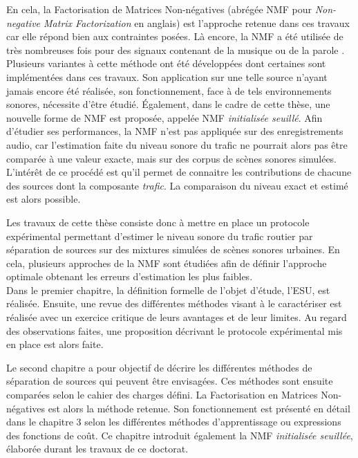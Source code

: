 En cela, la Factorisation de Matrices Non-négatives (abrégée NMF pour \textit{Non-negative Matrix Factorization} en anglais) \cite{lee_learning_1999} est l'approche retenue dans ces travaux car elle répond bien aux contraintes posées. Là encore, la NMF a été utilisée de très nombreuses fois pour des signaux contenant de la musique \cite{helen2005separation,fevotte_nonnegative_2009} ou de la parole \cite{wilson2008speech,schmidt2006single}. Plusieurs variantes à cette méthode ont été développées dont certaines sont implémentées dans ces travaux. Son application sur une telle source n'ayant jamais encore été réalisée, son fonctionnement, face à de tels environnements sonores,  nécessite d'être étudié. Également, dans le cadre de cette thèse, une nouvelle forme de NMF est proposée, appelée NMF \textit{initialisée seuillé}.
Afin d'étudier ses performances, la NMF n'est pas appliquée sur des enregistrements audio, car l'estimation faite du niveau sonore du trafic ne pourrait alors pas être comparée à une valeur exacte, mais sur des corpus de scènes sonores simulées. L'intérêt de ce procédé est qu'il permet de connaitre les contributions de chacune des sources dont la composante \textit{trafic}. La comparaison du niveau exact et estimé est alors possible.

Les travaux de cette thèse consiste donc à mettre en place un protocole expérimental permettant d'estimer le niveau sonore du trafic routier par séparation de sources sur des mixtures simulées de scènes sonores urbaines. En cela, plusieurs approches de la NMF sont étudiées afin de définir l'approche optimale obtenant les erreurs d'estimation les plus faibles.\\


Dans le premier chapitre, la définition formelle de l'objet d'étude, l'ESU, est réalisée. Ensuite, une revue des différentes méthodes visant à le caractériser est réalisée avec un exercice critique de leurs avantages et de leur limites. Au regard des observations faites, une proposition décrivant le protocole expérimental mis en place est alors faite.

Le second chapitre a pour objectif de décrire les différentes méthodes de séparation de sources qui peuvent être envisagées. Ces méthodes sont ensuite comparées selon le cahier des charges défini. La Factorisation en Matrices Non-négatives est alors la méthode retenue.
Son fonctionnement est présenté en détail dans le chapitre 3 selon les différentes méthodes d'apprentissage ou expressions des fonctions de coût. Ce chapitre introduit également la NMF \textit{initialisée seuillée}, élaborée durant les travaux de ce doctorat.

